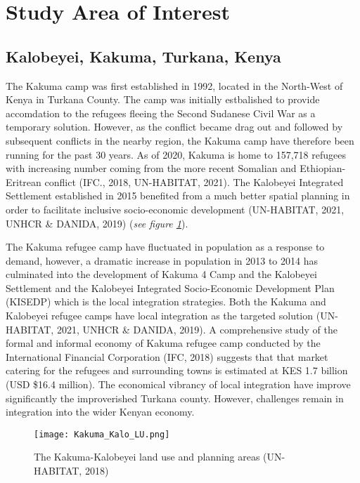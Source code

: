 \documentclass[11pt, a4paper, twoside]{report}
\begin{document}
\section{Study Area of Interest}\label{StudyAOI}
\subsection{Kalobeyei, Kakuma, Turkana, Kenya}\label{Kalobeyei}

The Kakuma camp was first established in 1992, located in the North-West of Kenya in Turkana County. The camp was initially estbalished to provide accomdation to the refugees fleeing the Second Sudanese Civil War as a temporary solution. However, as the conflict became drag out and followed by subsequent conflicts in the nearby region, the Kakuma camp have therefore been running for the past 30 years. As of 2020, Kakuma is home to 157,718 refugees with increasing number coming from the more recent Somalian and Ethiopian-Eritrean conflict (IFC., 2018, UN-HABITAT, 2021). The Kalobeyei Integrated Settlement established in 2015 benefited from a much better spatial planning in order to facilitate inclusive socio-economic development (UN-HABITAT, 2021, UNHCR \& DANIDA, 2019) (\textit{see figure \ref{fig:KU_KALO_LU}}).\\\par

The Kakuma refugee camp have fluctuated in population as a response to demand, however, a dramatic increase in population in 2013 to 2014 has culminated into the development of Kakuma 4 Camp and the Kalobeyei Settlement and the Kalobeyei Integrated Socio-Economic Development Plan (KISEDP) which is the local integration strategies. Both the Kakuma and Kalobeyei refugee camps have local integration as the targeted solution (UN-HABITAT, 2021, UNHCR \& DANIDA, 2019). A comprehensive study of the formal and informal economy of Kakuma refugee camp conducted by the International Financial Corporation (IFC, 2018) suggests that that market catering for the refugees and surrounding towns is estimated at KES 1.7 billion (USD \$16.4 million). The economical vibrancy of local integration have improve significantly the improverished Turkana county. However, challenges remain in integration into the wider Kenyan economy.\\\par

\begin{figure}[H]
  \centering
  \texttt{[image: Kakuma\_Kalo\_LU.png]}
  \caption{The Kakuma-Kalobeyei land use and planning areas (UN-HABITAT, 2018)}
  \label{fig:KU_KALO_LU}
\end{figure}
\end{document}

